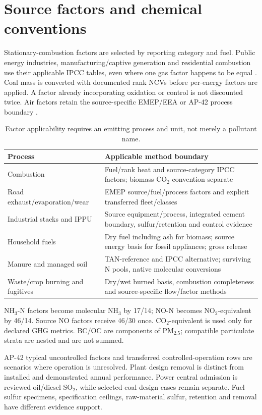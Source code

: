 \section{Source factors and chemical conventions}\label{sec:factors}
Stationary-combustion factors are selected by reporting category and fuel. Public energy industries, manufacturing/captive generation and residential combustion use their applicable IPCC tables, even where one gas factor happens to be equal \citep{ipcc2006energy,ipcc2019}. Coal mass is converted with documented rank NCVs before per-energy factors are applied. A factor already incorporating oxidation or control is not discounted twice. Air factors retain the source-specific EMEP/EEA or AP-42 process boundary \citep{emep2019,epaap42}.

\begin{table}[htbp]\centering\small
\begin{tabular}{@{}p{.29\linewidth}p{.60\linewidth}@{}}\toprule
Process & Applicable method boundary\\\midrule
Combustion & Fuel/rank heat and source-category IPCC factors; biomass CO$_2$ convention separate\\
Road exhaust/evaporation/wear & EMEP source/fuel/process factors and explicit transferred fleet/classes\\
Industrial stacks and IPPU & Source equipment/process, integrated cement boundary, sulfur/retention and control evidence\\
Household fuels & Dry fuel including ash for biomass; source energy basis for fossil appliances; gross release\\
Manure and managed soil & TAN-reference and IPCC alternative; surviving N pools, native molecular conversions\\
Waste/crop burning and fugitives & Dry/wet burned basis, combustion completeness and source-specific flow/factor methods\\\bottomrule
\end{tabular}
\caption{Factor applicability requires an emitting process and unit, not merely a pollutant name.}\label{tab:factortrap}
\end{table}

NH$_3$-N factors become molecular NH$_3$ by 17/14; NO-N becomes NO$_2$-equivalent by 46/14. Source NO factors receive 46/30 once. CO$_2$-equivalent is used only for declared GHG metrics. BC/OC are components of PM$_{2.5}$; compatible particulate strata are nested and are not summed.

AP-42 typical uncontrolled factors and transferred controlled-operation rows are scenarios where operation is unresolved. Plant design removal is distinct from installed and demonstrated annual performance. Power central admission is reviewed oil/diesel SO$_2$, while selected coal design cases remain separate. Fuel sulfur specimens, specification ceilings, raw-material sulfur, retention and removal have different evidence support.

